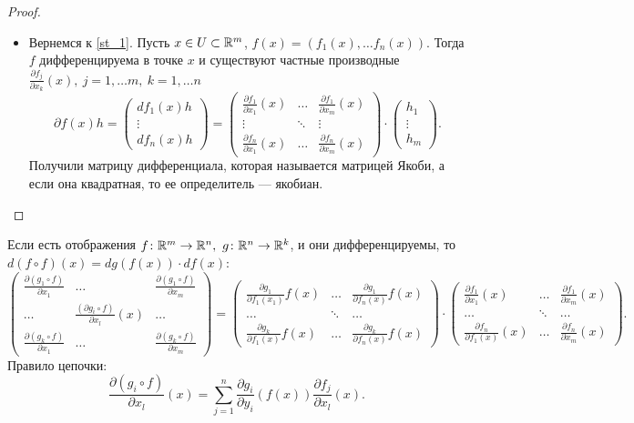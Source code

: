 \begin{proof}
\begin{description}
\begin{itemize}
	\item Вернемся к \ref{st_1}. Пусть $ x \in U \subset \mathbb{R}^{m}$, $ f(x) = \left( f_1(x), \ldots f_n(x) \right) $. Тогда $ f$ дифференцируема в точке $ x$ и существуют частные производные $ \frac{ \partial f_j}{ \partial x_k}(x), ~ j = 1, \ldots m, ~ k = 1, \ldots n$
    \[
	\partial f(x) h = 
	\begin{pmatrix}
	    df_1(x)h \\
	    \vdots\\
	    df_n(x)h
	\end{pmatrix} = 
	\begin{pmatrix}
	    \frac{\partial f_1}{\partial x_1}(x) & \dots & \frac{\partial f_1}{\partial x_m}(x) \\
	    \vdots & \ddots & \vdots \\
	    \frac{\partial f_n}{\partial x_1}(x) & \dots & \frac{\partial f_n}{\partial x_m}(x) 
	\end{pmatrix}
	\cdot 
	\begin{pmatrix}
	    h_1 \\ \vdots \\ h_m
	\end{pmatrix}
    .\] 
    Получили матрицу дифференциала, которая называется {\sf матрицей Якоби}, а если она квадратная, то ее определитель --- {\sf якобиан}.    
	    \end{itemize}
    \end{description} 
\end{proof}
\begin{st}
    Если есть отображения $ f\colon  \mathbb{R}^{m} \to  \mathbb{R}^{n} , ~ g \colon \mathbb{R}^{n} \to \mathbb{R}^{k} $, и они дифференцируемы, то $ d(f \circ f) (x) = dg(f(x))\cdot df(x)$:
     \[
    \begin{pmatrix}
	\frac{\partial (g_1\circ f)}{\partial x_1}&\dots & \frac{\partial  (g_1 \circ f)}{\partial x_m}\\
	\dots & \frac{ (\partial g_i \circ f)}{ \partial x_l}(x) & \dots \\
	\frac{\partial (g_k\circ f)}{\partial x_1}&\dots & \frac{\partial  (g_k \circ f)}{\partial x_m}
    \end{pmatrix} = 
    \begin{pmatrix}
	\frac{\partial g_1}{\partial f_1(x_1)}f(x)&\dots & \frac{\partial  g_1}{\partial f_n(x)}f(x)\\
	\dots & \ddots& \dots \\
	\frac{\partial g_k}{\partial f_1(x)}f(x)&\dots & \frac{\partial  g_k}{\partial f_n(x)}f(x)
    \end{pmatrix}  
    \cdot
    \begin{pmatrix}
	\frac{\partial f_1}{\partial x_1}(x)&\dots & \frac{\partial  f_1}{\partial x_m}(x)\\
	\dots & \ddots& \dots \\
	\frac{\partial f_n}{\partial f_1(x)}(x)&\dots & \frac{\partial  f_n}{\partial x_m}(x)
    \end{pmatrix}  
    .\] 
    {\sf Правило цепочки}:
    \[
	\frac{ \partial (g_i \circ f)}{ \partial x_l}(x) = \sum_{j=1}^{n} \frac{ \partial g_i}{ \partial y_i} (f(x)) \frac{ \partial f_j}{ \partial x_l}(x)
    .\] 
\end{st}
